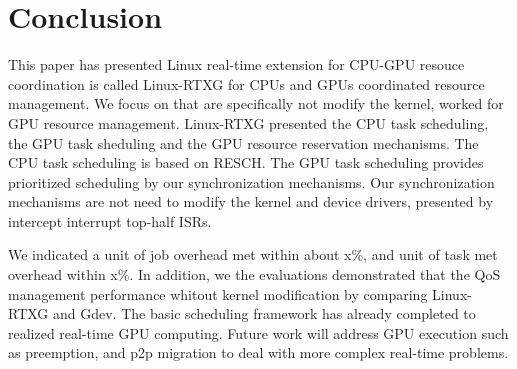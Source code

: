 \section{Conclusion}\label{sec:conclusion}
This paper has presented Linux real-time extension for CPU-GPU resouce coordination is called Linux-RTXG for CPUs and GPUs coordinated resource management.
We focus on that are specifically not modify the kernel, worked for GPU resource management.
Linux-RTXG presented the CPU task scheduling, the GPU task sheduling and the GPU resource reservation mechanisms.
The CPU task scheduling is based on RESCH.
The GPU task scheduling provides prioritized scheduling by our synchronization mechanisms.
Our synchronization mechanisms are not need to modify the kernel and device drivers, presented by intercept interrupt top-half ISRs.

We indicated a unit of job overhead met within about x\%, and unit of task met overhead within x\%.
In addition, we the evaluations demonstrated that the QoS management performance whitout kernel modification by comparing Linux-RTXG and Gdev.
The basic scheduling framework has already completed to realized real-time GPU computing.
Future work will address  GPU execution such as preemption, and p2p migration to
deal with more complex real-time problems.
